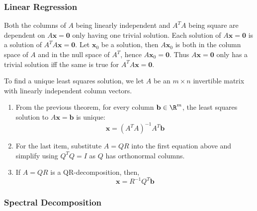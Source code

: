 \subsubsection{Linear Regression}

{Both the columns of \(A\) being linearly independent and \(A^TA\) being square are dependent on \(A\mathbf{x} = \mathbf{0}\) only having one trivial solution. Each solution of \(A\mathbf{x} = \mathbf{0}\) is a solution of \(A^TA\mathbf{x} = \mathbf{0}\). Let \(\mathbf{x}_0\) be a solution, then \(A\mathbf{x}_0\) is both in the column space of \(A\) and in the null space of \(A^T\), hence \(A\mathbf{x}_0 = \mathbf{0}\). Thus \(A\mathbf{x} = \mathbf{0}\) only has a trivial solution iff the same is true for \(A^TA\mathbf{x} = \mathbf{0}\).}

To find a unique least squares solution, we let \(A\) be an \(m \times n\) invertible matrix with linearly independent column vectors.
\begin{enumerate}
    \item From the previous theorem, for every column \(\mathbf{b} \in \R^m\), the least squares solution to \(A\mathbf{x} = \mathbf{b}\) is unique:
    \begin{equation}
        \mathbf{x} = (A^TA)^{-1}A^T\mathbf{b}
    \end{equation}
    \item For the last item, substitute \(A=QR\) into the first equation above and simplify using \(Q^TQ = I\) as \(Q\) has orthonormal columns.
    \item If \(A=QR\) is a QR-decomposition, then,
    \begin{equation}
        \mathbf{x} = R^{-1}Q^T\mathbf{b}
    \end{equation}
\end{enumerate}

\subsubsection{Spectral Decomposition}


